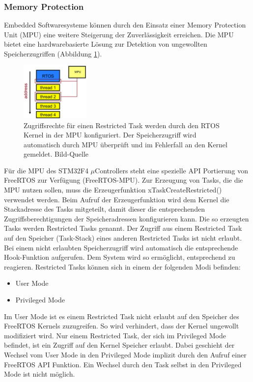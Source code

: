 \subsubsection{Memory Protection}
\label{sec:Memory Protection}
Embedded Softwaresysteme können durch den Einsatz einer Memory Protection Unit (MPU) eine weitere Steigerung der Zuverlässigkeit erreichen. Die MPU bietet eine hardwarebasierte Lösung zur Detektion von ungewollten Speicherzugriffen (Abbildung \ref{fig:AddressSpaceMMU}). 
\begin{figure}[htb]
	\centering
		\includegraphics[width=0.3\textwidth]{Pictures/EmbeddedCom/addressSpaceMMU}
	\caption{Zugriffsrechte für einen Restricted Task werden durch den RTOS Kernel in der MPU konfiguriert. Der Speicherzugriff wird automatisch durch MPU überprüft und im Fehlerfall an den Kernel gemeldet. Bild-Quelle~\protect{}}
	\label{fig:AddressSpaceMMU}
\end{figure} 
Für die MPU des STM32F4 $\mu$Controllers steht eine spezielle API Portierung von FreeRTOS zur Verfügung (FreeRTOS-MPU). Zur Erzeugung von Tasks, die die MPU nutzen sollen, muss die Erzeugerfunktion xTaskCreateRestricted() verwendet werden. Beim Aufruf der Erzeugerfunktion wird dem Kernel die Stackadresse des Tasks mitgeteilt, damit dieser die entsprechenden Zugriffsberechtigungen der Speicheradressen konfigurieren kann. Die so erzeugten Tasks werden Restricted Tasks genannt. Der Zugriff aus einem Restricted Task auf den Speicher (Task-Stack) eines anderen Restricted Tasks ist nicht erlaubt. Bei einem nicht erlaubten Speicherzugriff wird automatisch die entsprechende Hook-Funk\-tion aufgerufen. Dem System wird so er\-mög\-licht, entsprechend zu reagieren. Restricted Tasks kön\-nen sich in einem der folgenden Modi befinden:
\begin{itemize}
	\item User Mode
	\item Privileged Mode 
\end{itemize}
Im User Mode ist es einem Restricted Task nicht erlaubt auf den Speicher des FreeRTOS Kernels zuzugreifen. So wird verhindert, dass der Kernel ungewollt modifiziert wird. Nur einem Restricted Task, der sich im Privileged Mode befindet, ist ein Zugriff auf den Kernel Speicher erlaubt. Dabei geschieht der Wechsel vom User Mode in den Privileged Mode implizit durch den Aufruf einer FreeRTOS API Funktion. Ein Wechsel durch den Task selbst in den Privileged Mode ist nicht möglich.

